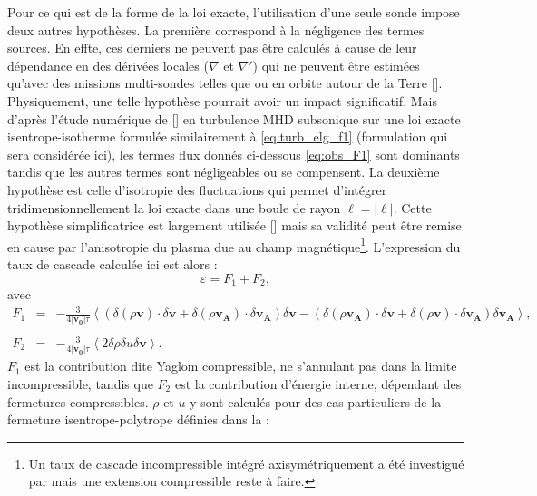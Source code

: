 Pour ce qui est de la forme de la loi exacte, l'utilisation d'une seule sonde impose deux autres hypothèses. La première correspond à la négligence des termes sources. En effte, ces derniers ne peuvent pas être calculés à cause de leur dépendance en des dérivées locales ($\nabla$ et $\nabla'$) qui ne peuvent être estimées qu'avec des missions multi-sondes telles que  ou  en orbite autour de la Terre [\cite{andres_energy_2019}]. Physiquement, une telle hypothèse pourrait avoir un impact significatif. Mais d'après l'étude numérique de [\cite{andres_energy_2019}] en turbulence MHD subsonique sur une loi exacte isentrope-isotherme formulée similairement à \eqref{eq:turb_elg_f1} (formulation qui sera considérée ici), les termes flux donnés ci-dessous \eqref{eq:obs_F1} sont dominants tandis que les autres termes sont négligeables ou se compensent. La deuxième hypothèse est celle d'isotropie des fluctuations qui permet d'intégrer tridimensionnellement la loi exacte dans une boule de rayon $\ell = |\boldsymbol{\ell}|$. Cette hypothèse simplificatrice est largement utilisée [\cite{parashar_observations_2022}] mais sa validité peut être remise en cause par l'anisotropie du plasma due au champ magnétique\footnote{Un taux de cascade incompressible intégré axisymétriquement a été investigué par \cite{andres_incompressible_2022} mais une extension compressible reste à faire.}. L'expression du taux de cascade calculée ici est alors : 
\begin{equation}
\label{eq:obs}\varepsilon = F_1 + F_2,
\end{equation}
avec
\begin{eqnarray}
\label{eq:obs_F1} F_1 &=& -\frac{3}{4|\boldsymbol{v_0}|\tau}\left<(\delta (\rho\boldsymbol{v}) \cdot \delta \boldsymbol{v}+ \delta (\rho\boldsymbol{v_A}) \cdot \delta \boldsymbol{v_A}) \delta \boldsymbol{v}  -(\delta (\rho\boldsymbol{v_A}) \cdot \delta \boldsymbol{v}  + \delta (\rho\boldsymbol{v}) \cdot \delta \boldsymbol{v_A}  ) \delta \boldsymbol{v_A} \right> \nonumber, \\ &&\\
\label{eq:obs_F2} F_2 &=& -\frac{3}{4|\boldsymbol{v_0}|\tau}\left<2 \delta \rho  \delta u  \delta \boldsymbol{v}\right>.
\end{eqnarray}
$F_1$ est la contribution dite Yaglom compressible, ne s'annulant pas dans la limite incompressible, tandis que $F_2$ est la contribution d'énergie interne, dépendant des fermetures compressibles. $\rho$ et $u$ y sont calculés pour des cas particuliers de la fermeture isentrope-polytrope définies dans la  :
